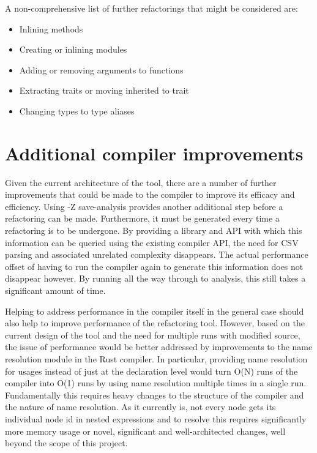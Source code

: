 \noindent
A non-comprehensive list of further refactorings that might be considered are:
\begin{itemize}
\item Inlining methods
\item Creating or inlining modules
\item Adding or removing arguments to functions
\item Extracting traits or moving inherited to trait
\item Changing types to type aliases
\end{itemize}


\section{Additional compiler improvements}
Given the current architecture of the tool, there are a number of further improvements that could be made to the compiler to improve its efficacy and efficiency. Using -Z save-analysis provides another additional step before a refactoring can be made. Furthermore, it must be generated every time a refactoring is to be undergone. By providing a library and API with which this information can be queried using the existing compiler API, the need for CSV parsing and associated unrelated complexity disappears. The actual performance offset of having to run the compiler again to generate this information does not disappear however.  By running all the way through to analysis, this still takes a significant amount of time. 


Helping to address performance in the compiler itself in the general case should also help to improve performance of the refactoring tool. However, based on the current design of the tool and the need for multiple runs with modified source, the issue of performance would be better addressed by improvements to the name resolution module in the Rust compiler. In particular, providing name resolution for usages instead of just at the declaration level would turn O(N) runs of the compiler into O(1) runs by using name resolution multiple times in a single run. Fundamentally this requires heavy changes to the structure of the compiler and the nature of name resolution. As it currently is, not every node gets its individual node id in nested expressions and to resolve this requires significantly more memory usage or novel, significant and well-architected changes, well beyond the scope of this project.

